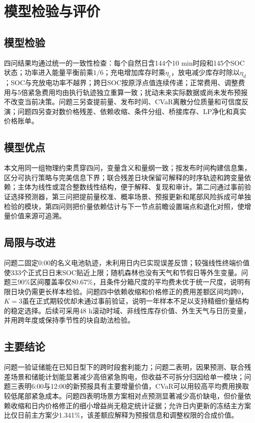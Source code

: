 \section{模型检验与评价}

\subsection{模型检验}

四问结果均通过统一的一致性检查：每个自然日含144个10 min时段和145个SOC状态；功率进入能量平衡前乘$1/6$；充电增加库存时乘$\eta_c$，放电减少库存时除以$\eta_d$；SOC与充放电功率不越界；跨日SOC按原浮点值连续传递；正常费用、调整费用与5倍紧急费用均由执行轨迹独立重算一致；扰动未来实际数据或尚未发布预报不改变当前决策。问题三另查提前量、发布时间、CVaR离散分位质量和可信度反演；问题四另查对数价格残差、依赖收缩、条件分组、桥接库存、LP净化和真实价格账单。

\subsection{模型优点}

本文用同一组物理约束贯穿四问，变量含义和量纲一致；按发布时间构建信息集，区分可执行策略与完美信息下界；联合残差日块保留可解释的时序轨迹和跨变量依赖；主体为线性或混合整数线性结构，便于解释、复现和审计。第二问通过事前验证选择预测器，第三问把提前量校准、概率场景、预报更新和尾部风险拆成可单独检验的模块，第四问则把价量依赖估计与下一节点前瞻设置端点和退化对照，使增量价值来源可追溯。

\subsection{局限与改进}

问题二固定0:00的名义电池轨迹，未利用日内已实现误差反馈；较强线性终端价值使333个正式日日末SOC贴近上限；随机森林也没有天气和节假日等外生变量。问题三90\%区间覆盖率仅80.67\%，且条件分箱尺度的平均费未优于统一尺度，说明有限日块仍需更长样本检验。问题四中依赖收缩和价格修正的费用差额区间均跨0，$K=3$虽在正式期较优却未通过事前验证，说明一年样本不足以支持精细价量结构的稳定选择。后续可采用48 h滚动时域、非线性库存价值、外生天气与日历变量，并用跨年度或保持季节性的块自助法检验。

\subsection{主要结论}

问题一验证储能在已知日型下的跨时段套利能力；问题二表明，因果预测、联合残差场景和储能计划能显著减少高倍紧急购电，但收益不可拆分归因给单一模块；问题三表明6:00与12:00的新预报具有主要增量价值，CVaR可以用较高平均费用换取较低尾部紧急成本。问题四表明场景方案相对点预测显著减少高价缺电，但价量依赖收缩和日内价格修正的细小增益尚无稳定统计证据；允许日内更新的冻结主方案比仅日前主方案少1.341\%，该差额应解释为预报信息和调整权限的合成价值。
